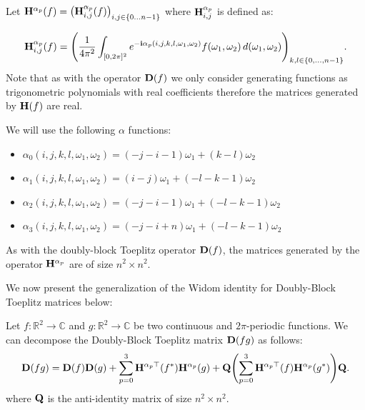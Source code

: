 Let $\Hmat^{\alpha_p} (f) = \leftmat \Hmat^{\alpha_p}_{i,j}(f) \rightmat_{i,j \in \{0 \ldots n-1 \}}$ where $\mathbf{H}^{\alpha_p}_{i,j}$ is defined as:

\begin{equation}
  \Hmat^{\alpha_p}_{i,j}(f) =\leftmat \frac{1}{4\pi^{2}}\int_{[0,2\pi]^{2}} e^{-\ci \alpha_p(i, j, k, l, \omega_1, \omega_2)}  f(\omega_{1},\omega_{2})\,d(\omega_{1},\omega_{2})
  \rightmat_{k,l \in \{0, \ldots, n-1 \}} .
\end{equation}
Note that as with the operator $\mathbf{D}(f)$ we only consider generating functions as trigonometric polynomials with real coefficients therefore the matrices generated by $\mathbf{H}(f)$ are real. 

We will use the following $\alpha$ functions:
\begin{itemize}
    \item[] $\alpha_0(i, j, k, l, \omega_1, \omega_2) = (-j-i-1)\omega_1 + (k-l)\omega_2$
    \item[] $\alpha_1(i, j, k, l, \omega_1, \omega_2) = (i-j)\omega_1 + (-l-k-1)\omega_2$
    \item[] $\alpha_2(i, j, k, l, \omega_1, \omega_2) = (-j-i-1)\omega_1 + (-l-k-1)\omega_2$
    \item[] $\alpha_3(i, j, k, l, \omega_1, \omega_2) = (-j-i+n)\omega_1 + (-l-k-1)\omega_2$
\end{itemize}
As with the doubly-block Toeplitz operator $\mathbf{D}(f)$, the matrices generated by the operator $\mathbf{H}^{\alpha_p}$ are of size $n^2 \times n^2$. 

We now present the generalization of the Widom identity for Doubly-Block Toeplitz matrices below:
\begin{lemma} \label{theorem:widom_idenity}
Let $f:\mathbb{R}^2 \rightarrow \mathbb{C}$ and $g:\mathbb{R}^2 \rightarrow \mathbb{C}$ be two continuous and $2\pi$-periodic functions. 
We can decompose the Doubly-Block Toeplitz matrix $\mathbf{D}(fg)$ as follows:
\begin{equation}
    \Dmat(fg) = \Dmat(f)\Dmat(g) + \sum_{p=0}^3 \Hmat^{\alpha_p \top}(f^*) \Hmat^{\alpha_p}(g) + \Qmat \left( \sum_{p=0}^3 \Hmat^{\alpha_p \top}(f) \Hmat^{\alpha_p }(g^*) \right) \Qmat.
\end{equation}
where $\mathbf{Q}$ is the anti-identity matrix of size $n^2 \times n^2$.
\end{lemma}

